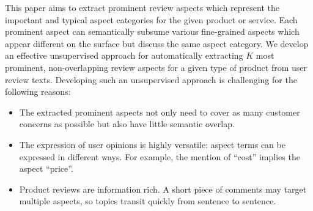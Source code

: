 
%
This paper aims to extract prominent review aspects which represent
the important and typical aspect categories for the given product or service.
Each prominent aspect can semantically subsume various 
fine-grained aspects which appear different on the surface but 
discuss the same aspect category.
We develop an effective unsupervised approach for automatically extracting $K$ most prominent, non-overlapping review aspects for a given type of product from user review texts.  
Developing such an unsupervised approach is challenging for 
the following reasons: 
\begin{itemize}
    \item 
	The extracted prominent aspects not only need to cover as many customer concerns as possible but also have little semantic overlap.
	
    \item The expression of user opinions is highly versatile: 
    aspect terms can be expressed in different ways. 
    For example, the mention of ``cost'' implies the aspect ``price''.
    \item Product reviews are information rich. A short piece of comments may target multiple aspects, so topics transit quickly from sentence to sentence. 
\end{itemize}


